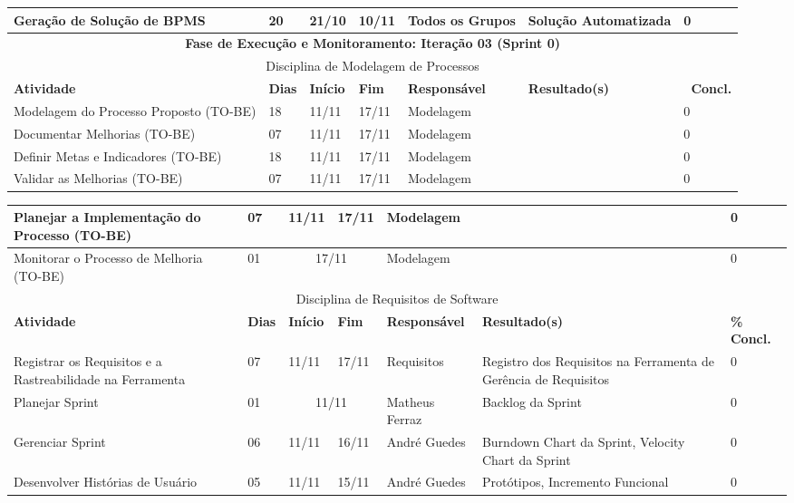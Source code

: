 \begin{landscape}
\begin{center}
\begin{tabular}{|m{6cm}|m{1cm}|m{1cm}|m{1cm}|m{4cm}|m{6cm}|m{2cm}|}
			Geração de Solução de BPMS & 20 & 21/10 & 10/11 & Todos os Grupos & Solução Automatizada & 0 \\ \hline
			\multicolumn{7}{|c|}{\textbf{Fase de Execução e Monitoramento: Iteração 03 (Sprint 0)}} \\
			\hline
			\multicolumn{7}{|c|}{Disciplina de Modelagem de Processos} \\
			\hline
			\textbf{Atividade} & \textbf{Dias} & \textbf{Início} & \textbf{Fim} & \textbf{Responsável} & \textbf{Resultado(s)} & \textbf{\ Concl.} \\ \hline
			Modelagem do Processo Proposto (TO-BE) & 18 & 11/11 & 17/11 & Modelagem & & 0 \\ \hline
			Documentar Melhorias (TO-BE) & 07 & 11/11 & 17/11 & Modelagem & & 0 \\ \hline
			Definir Metas e Indicadores (TO-BE) & 18 & 11/11 & 17/11 & Modelagem & & 0 \\ \hline
			Validar as Melhorias (TO-BE) & 07 & 11/11 & 17/11 & Modelagem & & 0 \\ \hline
			\end{tabular}
		\end{center}
		\begin{center}
			\begin{tabular}{|m{6cm}|m{1cm}|m{1cm}|m{1cm}|m{4cm}|m{6cm}|m{2cm}|}
			\hline
			Planejar a Implementação do Processo (TO-BE) & 07 & 11/11 & 17/11 & Modelagem & & 0 \\ \hline
			Monitorar o Processo de Melhoria (TO-BE) & 01 & \multicolumn{2}{c|}{17/11} & Modelagem & & 0 \\ \hline
			\multicolumn{7}{|c|}{Disciplina de Requisitos de Software} \\
			\hline
			\textbf{Atividade} & \textbf{Dias} & \textbf{Início} & \textbf{Fim} & \textbf{Responsável} & \textbf{Resultado(s)} & \textbf{\% Concl.} \\ \hline
			Registrar os Requisitos e a Rastreabilidade na Ferramenta & 07 & 11/11 & 17/11 & Requisitos & Registro dos Requisitos na Ferramenta de Gerência de Requisitos & 0 \\ \hline
			Planejar Sprint & 01 & \multicolumn{2}{c|}{11/11} & Matheus Ferraz & Backlog da Sprint & 0 \\ \hline
			Gerenciar Sprint & 06 & 11/11 & 16/11 & André Guedes & Burndown Chart da Sprint, Velocity Chart da Sprint & 0 \\ \hline
			Desenvolver Histórias de Usuário & 05 & 11/11 & 15/11 & André Guedes & Protótipos, Incremento Funcional & 0 \\ \hline

\end{tabular}
\end{center}
\end{landscape}

